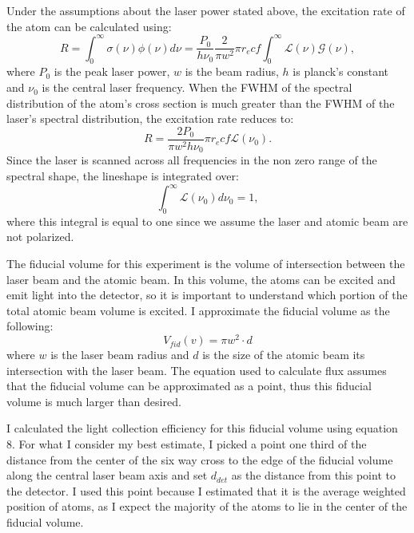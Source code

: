 \documentclass[12pt, a4paper]{article}
\begin{document}
Under the assumptions about the laser power stated above, the excitation rate of the atom can be calculated using:
\begin{equation}
R = \int_{0}^{\infty}\sigma(\nu) \phi(\nu)d\nu = \frac{P_0}{h \nu_0} \frac{2}{\pi w^2} \pi r_e c f \int_{0}^{\infty} \mathscr{L}(\nu) \mathscr{G}(\nu),
\end{equation}
where $P_0$ is the peak laser power, $w$ is the beam radius, $h$ is planck's constant and $\nu_0$ is the central laser frequency. When the FWHM of the spectral distribution of the atom's cross section is much greater than the FWHM of the laser's spectral distribution, the excitation rate reduces to:
\begin{equation}
R =\frac{2P_0}{\pi w^2 h \nu_0} \pi r_e c f \mathscr{L} (\nu_0).
\end{equation}
Since the laser is scanned across all frequencies in the non zero range of the spectral shape, the lineshape is integrated over:
\begin{equation}
\int_0^{\infty}\mathscr{L} (\nu_0)d\nu_0 = 1,
\end{equation}
where this integral is equal to one since we assume the laser and atomic beam are not polarized. 

The fiducial volume for this experiment is the volume of intersection between the laser beam and the atomic beam. In this volume, the atoms can be excited and emit light into the detector, so it is important to understand which portion of the total atomic beam volume is excited. I approximate the fiducial volume as the following:
\begin{equation}
V_{fid}(v) = \pi w^2\cdot d
\end{equation}
where $w$ is the laser beam radius and $d$ is the size of the atomic beam its intersection with the laser beam. The equation used to calculate flux assumes that the fiducial volume can be approximated as a point, thus this fiducial volume is much larger than desired. 

I calculated the light collection efficiency for this fiducial volume using equation 8. For what I consider my best estimate, I picked a point one third of the distance from the center of the six way cross to the edge of the fiducial volume along the central laser beam axis and set $d_{det}$ as the distance from this point to the detector. I used this point because I estimated that it is the average weighted position of atoms, as I expect the majority of the atoms to lie in the center of the fiducial volume.
\end{document}
